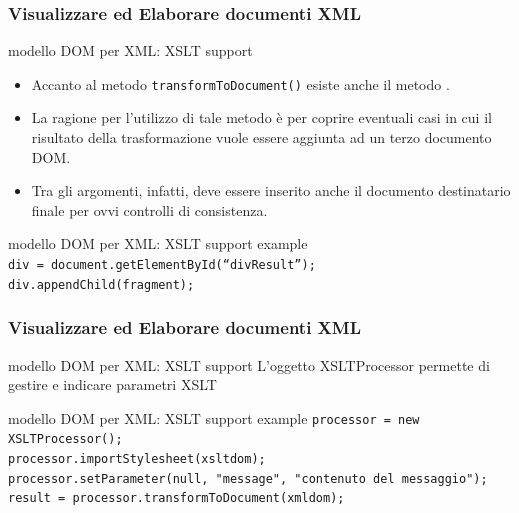 \begin{frame}
    \frametitle{Visualizzare ed Elaborare documenti XML}
    \addtocounter{nframe}{1}
    

    \begin{block}{modello DOM per XML: XSLT support}
        \begin{itemize}
            \item Accanto al metodo \texttt{transformToDocument()} esiste anche il metodo  . 
            \item La ragione per l'utilizzo di tale metodo è per coprire eventuali casi in cui il risultato della trasformazione vuole essere aggiunta ad un terzo documento DOM.
            \item Tra gli argomenti, infatti, deve essere inserito anche il documento destinatario finale per ovvi controlli di consistenza.
        \end{itemize}
    \end{block}

    \begin{block}{modello DOM per XML: XSLT support example}
        \\\texttt{div = document.getElementById(“divResult”); }
        \\\texttt{div.appendChild(fragment);}
    \end{block}
     
\end{frame}

\begin{frame}
    \frametitle{Visualizzare ed Elaborare documenti XML}
    \addtocounter{nframe}{1}
    

    \begin{block}{modello DOM per XML: XSLT support}
        L'oggetto XSLTProcessor permette di gestire e indicare parametri XSLT
    \end{block}

    \begin{block}{modello DOM per XML: XSLT support example}
         \texttt{processor = new XSLTProcessor();}
         \\\texttt{processor.importStylesheet(xsltdom);} 
         \\\texttt{processor.setParameter(null, "message", "contenuto del messaggio");} 
         \\\texttt{result = processor.transformToDocument(xmldom);}
    \end{block}
     
\end{frame}

